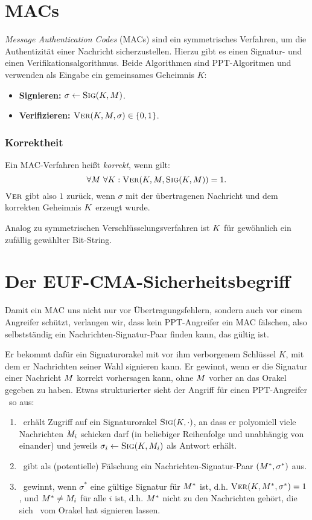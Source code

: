 \section{MACs}
\label{ch:symauth:macs} 
\textit{Message Authentication Codes} (MACs) sind ein symmetrisches
Verfahren, um die Authentizität einer Nachricht sicherzustellen. Hierzu
gibt es einen Signatur- und einen Verifikationsalgorithmus. Beide
Algorithmen sind PPT-Algoritmen und verwenden als Eingabe ein
gemeinsames Geheimnis $K$: 

\begin{itemize}
\item \textbf{Signieren:} $\sigma \leftarrow \textsc{Sig}(K,M)$.
\item \textbf{Verifizieren:} $\textsc{Ver}(K,M,\sigma) \in \{0,1\}$.
\end{itemize} 
\subsubsection*{Korrektheit}
Ein MAC-Verfahren heißt \textit{korrekt}, wenn gilt:
\[
\forall M~\forall K: \textsc{Ver}(K, M, \textsc{Sig}(K, M)) =1.
\]
$\textsc{Ver}$ gibt also $1$ zurück, wenn $\sigma$ mit der übertragenen
Nachricht und  dem korrekten Geheimnis $K$ erzeugt wurde.

Analog zu symmetrischen Verschlüsselungsverfahren ist $K$ für gewöhnlich
ein zufällig gewählter Bit-String.
\section{Der EUF-CMA-Sicherheitsbegriff}
\label{ch:symauth:sicherheit} Damit ein MAC uns nicht nur vor
Übertragungsfehlern, sondern auch vor einem Angreifer schützt, verlangen
wir, dass kein PPT-Angreifer ein MAC fälschen, also selbstständig ein Nachrichten-Signatur-Paar
finden kann, das gültig ist.

Er bekommt dafür ein Signaturorakel mit vor ihm verborgenem Schlüssel
$K$, mit dem er Nachrichten seiner Wahl signieren kann. Er gewinnt, wenn
er die Signatur einer Nachricht $M$ korrekt vorhersagen kann, ohne $M$
vorher an das Orakel gegeben zu haben. Etwas strukturierter sieht der
Angriff für einen PPT-Angreifer \A~so aus:
\begin{enumerate}
\item \A~erhält Zugriff auf ein Signaturorakel
  $\textsc{Sig}(K,\cdot)$, an dass er polyomiell viele Nachrichten $M_i$
  schicken darf (in beliebiger Reihenfolge und unabhängig von einander)
  und jeweils $\sigma_i \leftarrow \textsc{Sig}(K, M_i)$ als Antwort erhält.
\item \A~gibt als (potentielle) Fälschung ein Nachrichten-Signatur-Paar
  $(M^*,\sigma^*)$ aus.
\item \A~gewinnt, wenn $\sigma^*$ eine gültige Signatur für
  $M^*$ ist, d.h. $\textsc{Ver}(K, M^*, \sigma^*)=1$, und $M^*
  \neq M_i$ für alle $i$ ist, d.h. $M^*$ nicht zu den
  Nachrichten gehört, die sich \A~vom Orakel hat signieren lassen.
\end{enumerate} 

